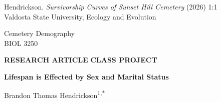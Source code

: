\documentclass[
  10pt,
  twocolumn]{article}
\author{}
\date{}
\begin{document}
\onecolumn
\begingroup
\thispagestyle{empty}
\sffamily

\noindent
\begin{minipage}[t]{0.66\linewidth}
  \scriptsize
  Hendrickson. \textit{Survivorship Curves of Sunset Hill Cemetery}
  \hfill (2026) 1:1\\
  Valdosta State University, Ecology and Evolution
\end{minipage}
\hfill
\begin{minipage}[t]{0.30\linewidth}
  \raggedleft
  \large Cemetery Demography\\[-2pt]
  \large BIOL 3250
\end{minipage}

\vspace{0.28in}

\noindent
\colorbox{reportred}{%
  \parbox{\dimexpr\linewidth-2\fboxsep\relax}{%
    \color{white}
    \textbf{RESEARCH ARTICLE}\hfill
    \textbf{CLASS PROJECT}
  }%
}

\vspace{0.18in}

\noindent
{\fontsize{23}{27}\selectfont
\textbf{Lifespan is Effected by Sex and Marital Status}\par}

\vspace{0.12in}

\noindent
{\small
Brandon Thomas Hendrickson\textsuperscript{1,*}
}

\vspace{0.08in}
\end{document}
